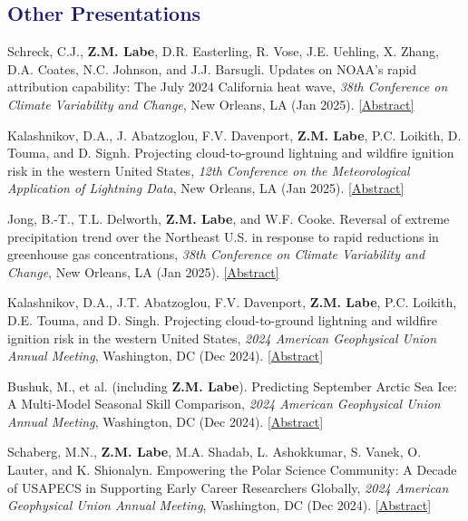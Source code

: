\documentclass[margin,line,palatino,courier,10pt]{res}
\begin{document}
\begin{resume}
\section{\sc \textcolor{MidnightBlue}{\large{\textbf{Other Presentations}}}} 
\begin{etaremune}[leftmargin=0in,topsep=0in,parsep=0in]
\item Schreck, C.J., \textbf{Z.M. Labe}, D.R. Easterling, R. Vose, J.E. Uehling, X. Zhang, D.A. Coates, N.C. Johnson, and J.J. Barsugli. Updates on NOAA’s rapid attribution capability: The July 2024 California heat wave, \textit{38th Conference on Climate Variability and Change}, New Orleans, LA (Jan 2025). \href{https://ams.confex.com/ams/105ANNUAL/meetingapp.cgi/Paper/456803}{[Abstract]}
\item Kalashnikov, D.A., J. Abatzoglou, F.V. Davenport, \textbf{Z.M. Labe}, P.C. Loikith, D. Touma, and D. Signh. Projecting cloud-to-ground lightning and wildfire ignition risk in the western United States, \textit{12th Conference on the Meteorological Application of Lightning Data}, New Orleans, LA (Jan 2025). \href{https://ams.confex.com/ams/105ANNUAL/meetingapp.cgi/Paper/449127}{[Abstract]}
\item Jong, B.-T., T.L. Delworth, \textbf{Z.M. Labe}, and W.F. Cooke. Reversal of extreme precipitation trend over the Northeast U.S. in response to rapid reductions in greenhouse gas concentrations, \textit{38th Conference on Climate Variability and Change}, New Orleans, LA (Jan 2025). \href{https://ams.confex.com/ams/105ANNUAL/meetingapp.cgi/Paper/457313}{[Abstract]}
\item Kalashnikov, D.A., J.T. Abatzoglou, F.V. Davenport, \textbf{Z.M. Labe}, P.C. Loikith, D.E. Touma, and D. Singh. Projecting cloud-to-ground lightning and wildfire ignition risk in the western United States, \textit{2024 American Geophysical Union Annual Meeting}, Washington, DC (Dec 2024). \href{https://agu.confex.com/agu/agu24/meetingapp.cgi/Paper/1570366}{[Abstract]}
\item Bushuk, M., et al. (including \textbf{Z.M. Labe}). Predicting September Arctic Sea Ice: A Multi-Model Seasonal Skill Comparison, \textit{2024 American Geophysical Union Annual Meeting}, Washington, DC (Dec 2024). \href{https://agu.confex.com/agu/agu24/meetingapp.cgi/Paper/1633366}{[Abstract]}
\item Schaberg, M.N., \textbf{Z.M. Labe}, M.A. Shadab, L. Ashokkumar, S. Vanek, O. Lauter, and K. Shionalyn. Empowering the Polar Science Community: A Decade of USAPECS in Supporting Early Career Researchers Globally, \textit{2024 American Geophysical Union Annual Meeting}, Washington, DC (Dec 2024). \href{https://agu.confex.com/agu/agu24/meetingapp.cgi/Paper/1696092}{[Abstract]}

\end{etaremune}
\end{resume}
\end{document}
